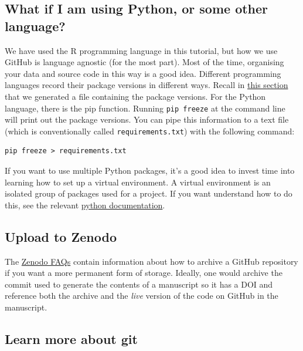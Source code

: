 \documentclass[11pt,onecolumn]{scrartcl}
\begin{document}
\subsection{What if I am using Python, or some other language?}
\label{sec:orgdbb7313}

We have used the R programming language in this tutorial, but how we use GitHub
is language agnostic (for the most part). Most of the time, organising your data
and source code in this way is a good idea. Different programming languages
record their package versions in different ways. Recall in \hyperref[sec:org3d977e1]{this section} that we
generated a file containing the package versions. For the Python language, there
is the pip function. Running \texttt{pip freeze} at the command line will print out the
package versions. You can pipe this information to a text file (which is
conventionally called \texttt{requirements.txt}) with the following command:

\lstset{language=sh,label= ,caption= ,captionpos=b,numbers=none}
\begin{lstlisting}
pip freeze > requirements.txt
\end{lstlisting}

If you want to use multiple Python packages, it's a good idea to invest time
into learning how to set up a virtual environment. A virtual environment is an
isolated group of packages used for a project. If you want understand how to do
this, see the relevant \href{https://docs.python.org/3/tutorial/venv.html}{python documentation}.

\subsection{Upload to Zenodo}
\label{sec:org33ff0a8}

The \href{https://help.zenodo.org/}{Zenodo FAQs} contain information about how to archive a GitHub repository if
you want a more permanent form of storage. Ideally, one would archive the commit
used to generate the contents of a manuscript so it has a DOI and reference both
the archive and the \emph{live} version of the code on GitHub in the manuscript.

\subsection{Learn more about git}
\label{sec:orgb013294}
\end{document}
